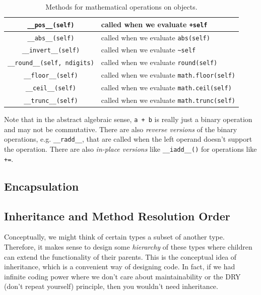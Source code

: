 \begin{definition}
\begin{table}[H]
\begin{tabular}{|c|p{8cm}|}
        \hline
        \texttt{\_\_pos\_\_(self)} & called when we evaluate \texttt{+self} \\
        \hline
        \texttt{\_\_abs\_\_(self)} & called when we evaluate \texttt{abs(self)} \\
        \hline
        \texttt{\_\_invert\_\_(self)} & called when we evaluate \texttt{\~{}self} \\
        \hline
        \texttt{\_\_round\_\_(self, ndigits)} & called when we evaluate \texttt{round(self)} \\
        \hline
        \texttt{\_\_floor\_\_(self)} & called when we evaluate \texttt{math.floor(self)} \\
        \hline
        \texttt{\_\_ceil\_\_(self)} & called when we evaluate \texttt{math.ceil(self)} \\
        \hline
        \texttt{\_\_trunc\_\_(self)} & called when we evaluate \texttt{math.trunc(self)} \\
        \hline
      \end{tabular}
      \caption{Methods for mathematical operations on objects.}
      \label{tab:mathematical_operations}
    \end{table}

    Note that in the abstract algebraic sense, \texttt{a + b} is really just a binary operation and may not be commutative. There are also \textit{reverse versions} of the binary operations, e.g. \texttt{\_\_radd\_\_}, that are called when the left operand doesn't support the operation. There are also \textit{in-place versions} like \texttt{\_\_iadd\_\_()} for operations like \texttt{+=}.  
  \end{definition}

\subsection{Encapsulation} 

  
 
\subsection{Inheritance and Method Resolution Order} 

  Conceptually, we might think of certain types a subset of another type. Therefore, it makes sense to design some \textit{hierarchy} of these types where children can extend the functionality of their parents. This is the conceptual idea of inheritance, which is a convenient way of designing code. In fact, if we had infinite coding power where we don't care about maintainability or the DRY (don't repeat yourself) principle, then you wouldn't need inheritance. 


